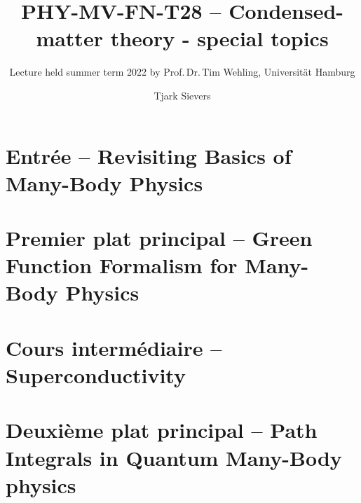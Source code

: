 \documentclass{lecture-notes}
\begin{document}
\title{PHY-MV-FN-T28 -- Condensed-matter theory - special topics}
\author{Tjark Sievers}
\subtitle{Lecture held summer term 2022 by Prof.\,Dr.\,Tim Wehling, Universität Hamburg}
\date{}
\maketitle

\part{Entrée -- Revisiting Basics of Many-Body Physics}\label{part:entree}




\part{Premier plat principal -- Green Function Formalism for Many-Body Physics}\label{part:green-function-formalism}





\part{Cours intermédiaire -- Superconductivity}\label{part:superconductivity}



\part{Deuxième plat principal -- Path Integrals in Quantum Many-Body physics}\label{part:path-integrals}




\end{document}

